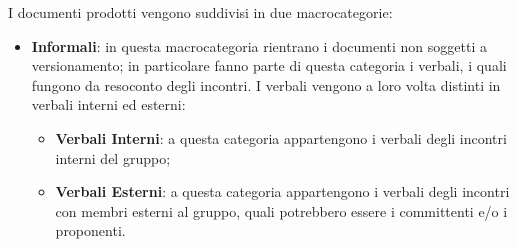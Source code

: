 I documenti prodotti vengono suddivisi in due macrocategorie:
\begin{itemize}
    \item \textbf{Informali}: in questa macrocategoria rientrano i documenti non soggetti a versionamento; in 
    particolare fanno parte di questa categoria i verbali, i quali fungono da resoconto degli incontri. I verbali 
    vengono a loro volta distinti in verbali interni ed esterni:
    \begin{itemize}
        \item \textbf{Verbali Interni}: a questa categoria appartengono i verbali degli incontri interni del gruppo;
        \item \textbf{Verbali Esterni}: a questa categoria appartengono i verbali degli incontri con membri esterni al 
        gruppo, quali potrebbero essere i committenti e/o i proponenti.
    \end{itemize}
    

\end{itemize}
